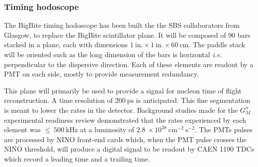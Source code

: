 \subsubsection{Timing hodoscope}

The BigBite timing hodoscope has been built the the SBS collaborators from Glasgow, to replace the BigBite scintillator plane.
It will be composed of 90 bars stacked in a plane, each with dimensions $1~\mathrm{in.}\times1~\mathrm{in.}\times60~\mathrm{cm}$. The paddle stack will be oriented such as the long dimension of the bars is horizontal {\it i.e.} perpendicular to the dispersive direction.
Each of these elements are readout by a PMT on each side, mostly to provide measurement redundancy.

This plane will primarily be used to provide a signal for nucleon time of flight reconstruction. A time resolution of $200~\mathrm{ps}$ is anticipated.
This fine segmentation is meant to lower the rates in the detector. Background studies made for the $G_M^n$ experimental readiness review %
demonstrated that the rates experienced by each element was $\leq~500~\mathrm{kHz}$ at a luminosity of $2.8~\times10^{38}~\mathrm{cm}^{-2}~\mathrm{s}^{-2}$. %
The PMTs pulses are processed by NINO front-end cards which, when the PMT pulse crosses the NINO threshold, will produce a digital signal to be readout by CAEN 1190 TDCs which record a leading time and a trailing time.

